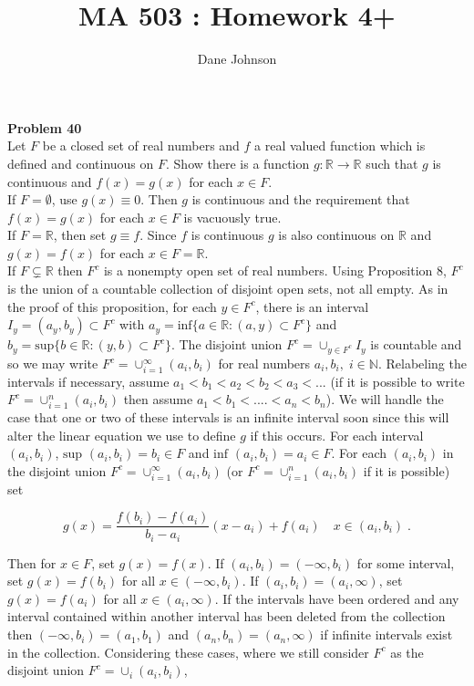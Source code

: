 \documentclass[a4paper]{article}
\title{MA 503 : Homework 4+}
\author{Dane Johnson}
\begin{document}
\maketitle




{\bf Problem 40}\\

Let $F$ be a closed set of real numbers and $f$ a real valued function which is defined and continuous on $F$. Show there is a function $g : \mathbb{R}\rightarrow \mathbb{R}$ such that $g$ is continuous and $f(x) = g(x)$ for each $x \in F$. \\

If $F = \emptyset$, use $g(x) \equiv 0$. Then $g$ is continuous and the requirement that $f(x) = g(x)$ for each $x \in F$ is vacuously true.\\

If $F = \mathbb{R}$, then set $g \equiv f$. Since $f$ is continuous $g$ is also continuous on $\mathbb{R}$ and $g(x) = f(x)$ for each $x \in F = \mathbb{R}$. \\

If $F \subsetneq \mathbb{R}$ then $F^c$ is a nonempty open set of real numbers. Using Proposition 8, $F^c$ is the union of a countable collection of disjoint open sets, not all empty. As in the proof of this proposition, for each $y \in F^c$, there is an interval $I_y = (a_y,b_y) \subset F^c$ with $a_y = \text{inf}\{a \in \mathbb{R}: (a,y) \subset F^c\}$ and $b_y = \text{sup}\{b \in \mathbb{R}: (y,b) \subset F^c\}$. The disjoint union  $F^c = \cup_{y \in F^c}I_y$ is countable and so we may write $F^c = \cup_{i=1}^{\infty} (a_i,b_i)$ for real numbers $a_i,b_i, \;i \in \mathbb{N}$. Relabeling the intervals if necessary, assume $a_1<b_1<a_2<b_2<a_3<...$ (if it is possible to write $F^c = \cup_{i=1}^{n} (a_i,b_i)$ then assume $a_1<b_1<....<a_n<b_n$). We will handle the case that one or two of these intervals is an infinite interval soon since this will alter the linear equation we use to define $g$ if this occurs. For each interval $(a_i,b_i)$, $\text{sup }(a_i,b_i) = b_i \in F$ and $\text{inf }(a_i,b_i) = a_i \in F$. For each $(a_i,b_i)$ in the disjoint union $F^c = \cup_{i=1}^{\infty} (a_i,b_i)$ (or $F^c = \cup_{i=1}^{n} (a_i,b_i)$ if it is possible) set 

$$g(x) = \frac{f(b_i) - f(a_i)}{b_i-a_i}(x-a_i) + f(a_i) \quad x \in (a_i,b_i) \;.$$

Then for $x \in F$, set $g(x) = f(x)$. If $(a_i, b_i) = (-\infty, b_i)$ for some interval, set $g(x) = f(b_i)$ for all $x \in (-\infty, b_i)$. If $(a_i,b_i) = (a_i,\infty)$, set $g(x) = f(a_i)$ for all $x \in (a_i,\infty)$. If the intervals have been ordered and any interval contained within another interval has been deleted from the collection then $(-\infty,b_i) = (a_1,b_1)$ and $(a_n,b_n) = (a_n,\infty)$ if infinite intervals exist in the collection. Considering these cases, where we still consider $F^c$ as the disjoint union $F^c = \cup_i (a_i,b_i)$, 
\end{document}
